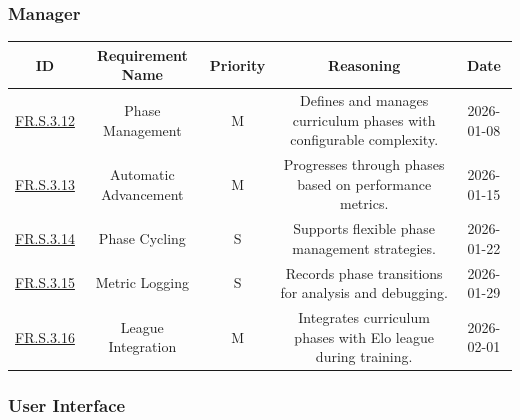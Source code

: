 \documentclass{article}
\begin{document}
\vspace{1em}

\subsubsection*{\CurriculumLearning{} Manager}

\begin{tabular}{|c|c|c|c|c|}
\hline
\textbf{ID} & \textbf{Requirement Name} & \textbf{Priority} &
\textbf{Reasoning} & \textbf{Date} \\
\hline
\hyperref[FR.S.3.12]{FR.S.3.12} & Phase Management & M &
\parbox[t]{4cm}{Defines and manages curriculum phases with configurable complexity.} &
2026-01-08 \\
\hline
\hyperref[FR.S.3.13]{FR.S.3.13} & Automatic Advancement & M &
\parbox[t]{4cm}{Progresses through phases based on performance metrics.} &
2026-01-15 \\
\hline
\hyperref[FR.S.3.14]{FR.S.3.14} & Phase Cycling & S &
\parbox[t]{4cm}{Supports flexible phase management strategies.} &
2026-01-22 \\
\hline
\hyperref[FR.S.3.15]{FR.S.3.15} & Metric Logging & S &
\parbox[t]{4cm}{Records phase transitions for analysis and debugging.} &
2026-01-29 \\
\hline
\hyperref[FR.S.3.16]{FR.S.3.16} & League Integration & M &
\parbox[t]{4cm}{Integrates curriculum phases with Elo league during training.} &
2026-02-01 \\
\hline
\end{tabular}

\vspace{1em}

\subsubsection*{User Interface}
\end{document}
